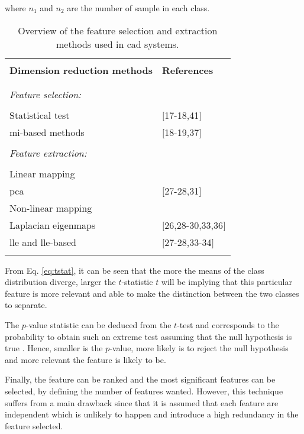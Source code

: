 \noindent where $n_1$ and $n_2$ are the number of sample in each class.

\begin{table}
	\caption{Overview of the feature selection and extraction methods used in \ac{cad} systems.}
	\small
	\begin{tabular}{p{.65\linewidth} p{.25\linewidth}}
		\hline \\ [-1.5ex]
		\textbf{Dimension reduction methods} & \textbf{References} \\ \\ [-1.5ex]
		\hline \\ [-1.5ex]
		\textit{Feature selection:} & \\ \\ [-1.5ex]
		\quad Statistical test & $[$17-18,41$]$ \\
		\quad \ac{mi}-based methods & $[$18-19,37$]$ \\ \\ [-1.5ex]
		\textit{Feature extraction:} & \\ \\ [-1.5ex]
		\quad Linear mapping & \\
		\quad \quad \acs{pca} & $[$27-28,31$]$ \\
		\quad Non-linear mapping & \\
		\quad \quad Laplacian eigenmaps & $[$26,28-30,33,36$]$ \\
		\quad \quad \acs{lle} and \acs{lle}-based & $[$27-28,33-34$]$ \\ \\ [-1.5ex]
		\hline
	\end{tabular}
	\label{tab:featext}
\end{table}

From Eq. \eqref{eq:tstat}, it can be seen that the more the means of the class distribution diverge, larger the $t$-statistic $t$ will be implying that this particular feature is more relevant and able to make the distinction between the two classes to separate. 

The $p$-value statistic can be deduced from the $t$-test and corresponds to the probability to obtain such an extreme test assuming that the null hypothesis is true \cite{Goodman1999}. Hence, smaller is the $p$-value, more likely is to reject the null hypothesis and more relevant the feature is likely to be.

Finally, the feature can be ranked and the most significant features can be selected, by defining the number of features wanted. However, this technique suffers from a main drawback since that it is assumed that each feature are independent which is unlikely to happen and introduce a high redundancy in the feature selected.

